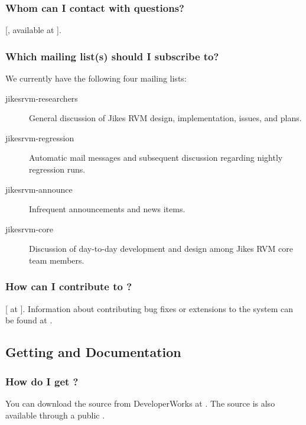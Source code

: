 \subsubsection{Whom can I contact with questions?}

[, available at {\tt \RVMDownloadURL}]{\RVMDownloadURL}.

\subsubsection{Which mailing list(s) should I subscribe to?}

We currently have the following four mailing lists:

\begin{description}
\item[jikesrvm-researchers]
    General discussion of Jikes RVM design, implementation, issues, and
    plans.
\item[jikesrvm-regression]
   Automatic mail messages and subsequent discussion regarding nightly
   regression runs.
\item[jikesrvm-announce]
  Infrequent announcements and news items.
\item[jikesrvm-core]
  Discussion of day-to-day development and design among Jikes RVM  core team
  members.
\end{description}


\subsubsection{How can I contribute to \jrvm{}?}
[ at
{\tt \RVMBugURL}]{\RVMBugURL}.  
Information about contributing bug fixes or extensions to the system
can be found at
\xlink{{\tt \RVMContribURL}}{\RVMContribURL}.   

\subsection{Getting \jrvm{} and Documentation}

\subsubsection{How do I get \jrvm{}?}

You can download the \jrvm{} source from DeveloperWorks at \xlink{{\tt
\RVMDownloadURL}}{\RVMDownloadURL}.  The \jrvm{} source is also available
through a public .

